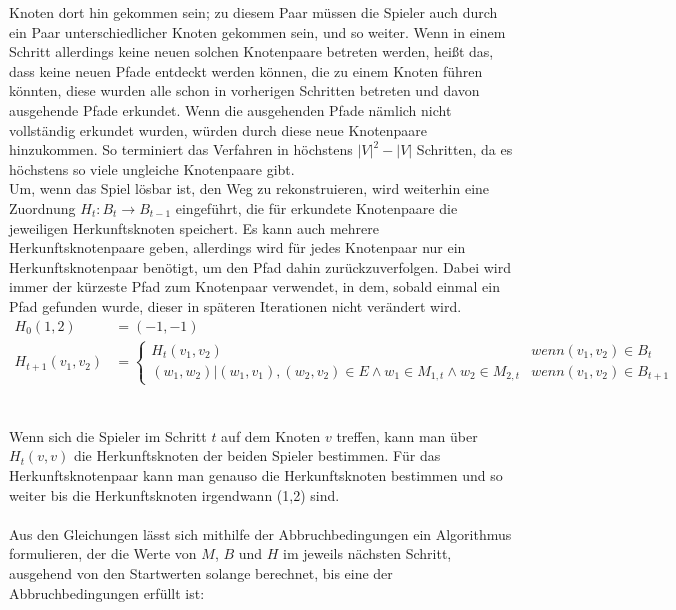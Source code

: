 \documentclass[a4paper,10pt,ngerman]{scrartcl}
\begin{document}
Knoten dort hin gekommen sein; zu diesem Paar müssen die Spieler auch durch ein Paar unterschiedlicher Knoten gekommen sein,
und so weiter. Wenn in einem Schritt allerdings keine neuen solchen Knotenpaare betreten werden, heißt das, dass keine neuen
Pfade entdeckt werden können, die zu einem Knoten führen könnten, diese wurden alle schon in vorherigen Schritten betreten und
davon ausgehende Pfade erkundet. Wenn die ausgehenden Pfade nämlich nicht vollständig erkundet wurden, würden durch diese neue
Knotenpaare hinzukommen. So terminiert das Verfahren in höchstens $|V|^2 - |V|$ Schritten, da es höchstens so viele ungleiche Knotenpaare gibt. \\
Um, wenn das Spiel lösbar ist, den Weg zu rekonstruieren, wird weiterhin eine  Zuordnung $H_t:B_t \rightarrow B_{t-1}$ eingeführt,
die für erkundete Knotenpaare die jeweiligen Herkunftsknoten speichert. Es kann auch mehrere Herkunftsknotenpaare geben, allerdings wird für
jedes Knotenpaar nur ein Herkunftsknotenpaar benötigt, um den Pfad dahin zurückzuverfolgen. 
Dabei wird immer der kürzeste Pfad zum Knotenpaar verwendet, in dem, sobald einmal ein Pfad gefunden wurde, dieser in späteren Iterationen nicht verändert wird. 
\begin{align*}
  H_0(1,2)         & = (-1, -1)                                                                                                        \\
  H_{t+1}(v_1,v_2) & = \begin{cases}
                         H_{t}(v_1, v_2)                                                                    & wenn (v_1,v_2) \in B_t     \\
                         (w_1, w_2)|(w_1,v_1), (w_2,v_2) \in E \land w_1 \in M_{1,t} \land w_2 \in M_{2, t} & wenn (v_1,v_2) \in B_{t+1}
                       \end{cases}
\end{align*}\\\\
Wenn sich die Spieler im Schritt $t$ auf dem Knoten $v$ treffen, kann man über $H_{t}(v,v)$ die Herkunftsknoten der
beiden Spieler bestimmen. Für das Herkunftsknotenpaar kann man genauso die Herkunftsknoten bestimmen und so weiter
bis die Herkunftsknoten irgendwann (1,2) sind.\\\\
Aus den Gleichungen lässt sich mithilfe der Abbruchbedingungen ein Algorithmus formulieren, der die Werte von $M$, $B$
und $H$ im jeweils nächsten Schritt, ausgehend von den Startwerten solange berechnet, bis eine der Abbruchbedingungen erfüllt ist:
\end{document}
